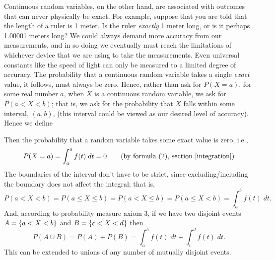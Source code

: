 \noindent Continuous random variables, on the other hand, are associated with outcomes that can never physically be exact. For example, suppose that you are told that the length of a ruler is 1 meter. Is the ruler \textit{exactly} 1 meter long, or is it perhaps 1.00001 meters long? We could always demand more accuracy from our measurements, and in so doing we eventually must reach the limitations of whichever device that we are using to take the measurements. Even universal constants like the speed of light can only be measured to a limited degree of accuracy. The probability that a continuous random variable takes a single \textit{exact} value, it follows, must always be zero. Hence, rather than ask for $P(X = a)$, for some real number $a$, when $X$ is a continuous random variable, we ask for $P(a < X < b)$; that is, we ask for the probability that $X$ falls within some interval, $(a,b)$, (this interval could be viewed as our desired level of accuracy). \\

\noindent Hence we define

  	\bigskip
	
	\hfil{}
	\bigskip
	\bigskip

\noindent Then the probability that a random variable takes some exact value is zero, i.e., 
\[
P(X = a) = \int_a^a f(t) \; dt = 0 \tag{by formula (2), section \ref{integration}}
\]
The boundaries of the interval don't have to be strict, since excluding/including the boundary does not affect the integral; that is,
\[
P(a < X < b) = P(a \leq X \leq b) = P(a < X \leq b) = P(a \leq X < b) = \int_a^b f(t) \; dt.
\]
\noindent And, according to probability measure axiom 3, if we have two disjoint events $A = \left\{a < X < b\right\}$ and $B = \left\{c < X < d\right\}$ then 
\[
P(A \cup B) = P(A) + P(B) = \int_a^bf(t) \; dt + \int_c^d f(t) \; dt. 
\]
\noindent This can be extended to unions of any number of mutually disjoint events.
 
